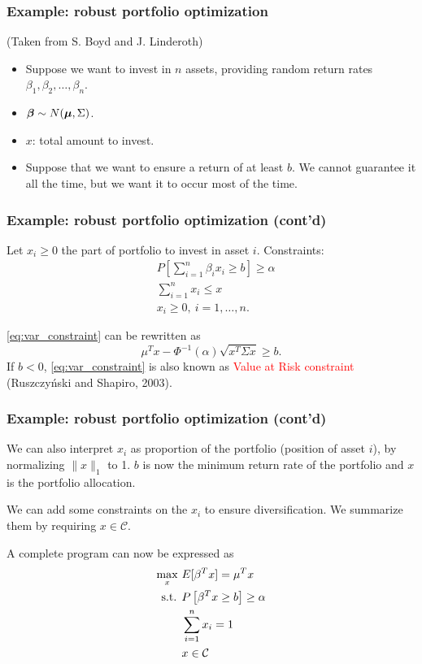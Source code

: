 \documentclass{beamer}
\begin{document}
\begin{frame}
\frametitle{Example: robust portfolio optimization}

(Taken from S. Boyd and J. Linderoth)

\begin{itemize}
	\item 
Suppose we want to invest in $n$ assets, providing random return rates $\beta_1, \beta_2,\ldots, \beta_n$.
\item
${\boldsymbol{\beta}} \sim N({\boldsymbol{\mu}}, \Sigma)$.
\item
$x$: total amount to invest.
\item
Suppose that we want to ensure a return of at least $b$.
We cannot guarantee it all the time, but we want it to occur most of the time.
\end{itemize}

\end{frame}

\begin{frame}
\frametitle{Example: robust portfolio optimization (cont'd)}

Let $x_i \geq 0$ the part of portfolio to invest in asset $i$.
Constraints:
\begin{align}
& P\left[ \sum_{i = 1}^n \beta_i x_i \geq b  \right] \geq \alpha \label{eq:var_constraint} \\
& \sum_{i = 1}^n x_i \leq x \nonumber \\
& x_i \geq 0,\ i = 1,\ldots,n.  \nonumber
\end{align}

\mbox{}

\eqref{eq:var_constraint} can be rewritten as
$$
\mu^Tx - \Phi^{-1}(\alpha) \sqrt{x^T\Sigma x} \geq b.
$$
If $b < 0$, \eqref{eq:var_constraint} is also known as \textcolor{red}{Value at Risk constraint} (Ruszczyński and Shapiro, 2003).


\end{frame}

\begin{frame}
\frametitle{Example: robust portfolio optimization (cont'd)}

We can also interpret $x_i$ as proportion of the portfolio (position of asset $i$), by normalizing $\| x \|_1$ to 1.
$b$ is now the minimum return rate of the portfolio and $x$ is the portfolio allocation.

\mbox{}

We can add some constraints on the $x_i$ to ensure diversification. We summarize them by requiring $x \in \mathcal{C}$.

\mbox{}

A complete program can now be expressed as
\begin{align*}
\max_x \ & E[\beta^T x] = \mu^T x \\
\mbox{s.t. } & P\left[ \beta^T x \geq b \right] \geq \alpha  \\
& \sum_{i = 1}^n x_i = 1 \\
& x \in {\mathcal{C}}
\end{align*}

\end{frame}
\end{document}
